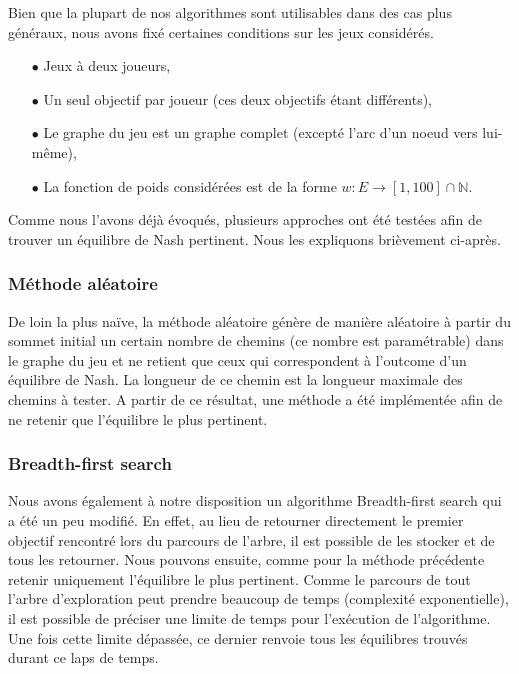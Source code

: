Bien que la plupart de nos algorithmes sont utilisables dans des cas plus généraux, nous avons fixé certaines conditions sur les jeux considérés.

\begin{itemize}	
	\item[$\bullet$] Jeux à deux joueurs,
	\item[$\bullet$] Un seul objectif par joueur (ces deux objectifs étant différents), 
	\item[$\bullet$] Le graphe du jeu est un graphe complet (excepté l'arc d'un noeud vers lui-même),
	\item[$\bullet$] La fonction de poids considérées est de la forme $w : E \rightarrow [1,100] \cap \mathbb{N} $.
\end{itemize}

Comme nous l'avons déjà évoqués, plusieurs approches ont été testées afin de trouver un équilibre de Nash pertinent. Nous les expliquons brièvement ci-après.

\subsubsection*{Méthode aléatoire}
De loin la plus naïve, la méthode aléatoire génère de manière aléatoire à partir du sommet initial un certain nombre de chemins (ce nombre est paramétrable) dans le graphe du jeu et ne retient que ceux qui correspondent à l'outcome d'un équilibre de Nash. La longueur de ce chemin est la longueur maximale des chemins à tester. A partir de ce résultat, une méthode a été implémentée afin de ne retenir que l'équilibre le plus pertinent.

\subsubsection*{Breadth-first search}
Nous avons également à notre disposition un algorithme Breadth-first search qui a été un peu modifié. En effet, au lieu de retourner directement le premier objectif rencontré lors du parcours de l'arbre, il est possible de les stocker et de tous les retourner. Nous pouvons ensuite, comme pour la méthode précédente retenir uniquement l'équilibre le plus pertinent. Comme le parcours de tout l'arbre d'exploration peut prendre beaucoup de temps  (complexité exponentielle), il est possible de préciser une limite de temps pour l'exécution de l'algorithme. Une fois cette limite dépassée, ce dernier renvoie tous les équilibres trouvés durant ce laps de temps.

